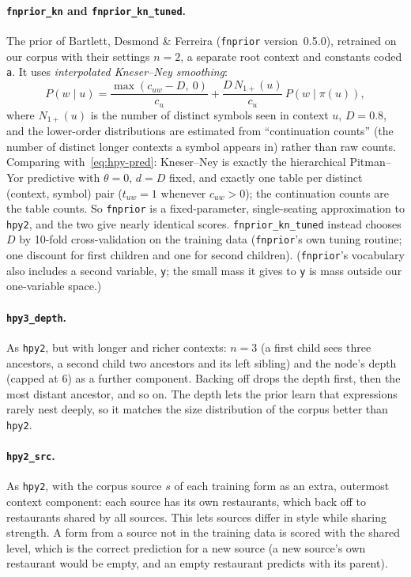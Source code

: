 \documentclass[11pt]{article}
\begin{document}
\paragraph{\texttt{fnprior\_kn} and \texttt{fnprior\_kn\_tuned}.} The prior of Bartlett, Desmond \&
Ferreira (\texttt{fnprior} version~0.5.0), retrained on our corpus with their settings $n=2$,
a separate root context and constants coded \texttt{a}. It uses \emph{interpolated Kneser--Ney
smoothing}:
\[
  P(w \mid u) = \frac{\max(c_{uw} - D,\ 0)}{c_u} + \frac{D\, N_{1+}(u)}{c_u}\, P(w \mid \pi(u)),
\]
where $N_{1+}(u)$ is the number of distinct symbols seen in context $u$, $D=0.8$, and the lower-order
distributions are estimated from ``continuation counts'' (the number of distinct longer contexts a
symbol appears in) rather than raw counts. Comparing with~\eqref{eq:hpy-pred}: Kneser--Ney is exactly
the hierarchical Pitman--Yor predictive with $\theta = 0$, $d = D$ fixed, and exactly one table per
distinct (context, symbol) pair ($t_{uw} = 1$ whenever $c_{uw}>0$); the continuation counts are the
table counts. So \texttt{fnprior} is a fixed-parameter, single-seating approximation to
\texttt{hpy2}, and the two give nearly identical scores. \texttt{fnprior\_kn\_tuned} instead chooses $D$ by 10-fold
cross-validation on the training data (\texttt{fnprior}'s own tuning routine; one discount for first
children and one for second children). (\texttt{fnprior}'s
vocabulary also includes a second variable, \texttt{y}; the small mass it gives to \texttt{y} is mass
outside our one-variable space.)

\paragraph{\texttt{hpy3\_depth}.} As \texttt{hpy2}, but with longer and richer contexts: $n=3$
(a first child sees three ancestors, a second child two ancestors and its left sibling) and the node's
depth (capped at 6) as a further component. Backing off drops the depth first, then the most distant
ancestor, and so on. The depth lets the prior learn that expressions rarely nest deeply, so it matches
the size distribution of the corpus better than \texttt{hpy2}.

\paragraph{\texttt{hpy2\_src}.} As \texttt{hpy2}, with the corpus source $s$ of each training form as an
extra, outermost context component: each source has its own restaurants, which back off to restaurants
shared by all sources. This lets sources differ in style while sharing strength. A form from a source
not in the training data is scored with the shared level, which is the correct prediction for a new
source (a new source's own restaurant would be empty, and an empty restaurant predicts with its parent).
\end{document}
